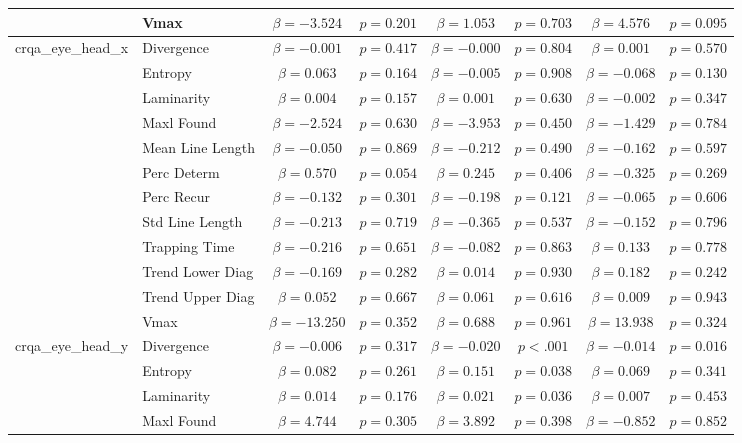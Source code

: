 \begin{tabular}{llcc|cc|cc}
 & Vmax & $\beta = -3.524$ & $p = 0.201$ & $\beta = 1.053$ & $p = 0.703$ & $\beta = 4.576$ & $p = 0.095$ \\
\midrule
\multirow{12}{*}{crqa_eye_head_x} & Divergence & $\beta = -0.001$ & $p = 0.417$ & $\beta = -0.000$ & $p = 0.804$ & $\beta = 0.001$ & $p = 0.570$ \\
 & Entropy & $\beta = 0.063$ & $p = 0.164$ & $\beta = -0.005$ & $p = 0.908$ & $\beta = -0.068$ & $p = 0.130$ \\
 & Laminarity & $\beta = 0.004$ & $p = 0.157$ & $\beta = 0.001$ & $p = 0.630$ & $\beta = -0.002$ & $p = 0.347$ \\
 & Maxl Found & $\beta = -2.524$ & $p = 0.630$ & $\beta = -3.953$ & $p = 0.450$ & $\beta = -1.429$ & $p = 0.784$ \\
 & Mean Line Length & $\beta = -0.050$ & $p = 0.869$ & $\beta = -0.212$ & $p = 0.490$ & $\beta = -0.162$ & $p = 0.597$ \\
 & Perc Determ & $\beta = 0.570$ & $p = 0.054$ & $\beta = 0.245$ & $p = 0.406$ & $\beta = -0.325$ & $p = 0.269$ \\
 & Perc Recur & $\beta = -0.132$ & $p = 0.301$ & $\beta = -0.198$ & $p = 0.121$ & $\beta = -0.065$ & $p = 0.606$ \\
 & Std Line Length & $\beta = -0.213$ & $p = 0.719$ & $\beta = -0.365$ & $p = 0.537$ & $\beta = -0.152$ & $p = 0.796$ \\
 & Trapping Time & $\beta = -0.216$ & $p = 0.651$ & $\beta = -0.082$ & $p = 0.863$ & $\beta = 0.133$ & $p = 0.778$ \\
 & Trend Lower Diag & $\beta = -0.169$ & $p = 0.282$ & $\beta = 0.014$ & $p = 0.930$ & $\beta = 0.182$ & $p = 0.242$ \\
 & Trend Upper Diag & $\beta = 0.052$ & $p = 0.667$ & $\beta = 0.061$ & $p = 0.616$ & $\beta = 0.009$ & $p = 0.943$ \\
 & Vmax & $\beta = -13.250$ & $p = 0.352$ & $\beta = 0.688$ & $p = 0.961$ & $\beta = 13.938$ & $p = 0.324$ \\
\midrule
\multirow{12}{*}{crqa_eye_head_y} & Divergence & $\beta = -0.006$ & $p = 0.317$ & $\beta = -0.020$ & $p < .001$ & $\beta = -0.014$ & $p = 0.016$ \\
 & Entropy & $\beta = 0.082$ & $p = 0.261$ & $\beta = 0.151$ & $p = 0.038$ & $\beta = 0.069$ & $p = 0.341$ \\
 & Laminarity & $\beta = 0.014$ & $p = 0.176$ & $\beta = 0.021$ & $p = 0.036$ & $\beta = 0.007$ & $p = 0.453$ \\
 & Maxl Found & $\beta = 4.744$ & $p = 0.305$ & $\beta = 3.892$ & $p = 0.398$ & $\beta = -0.852$ & $p = 0.852$ \\

\end{tabular}
